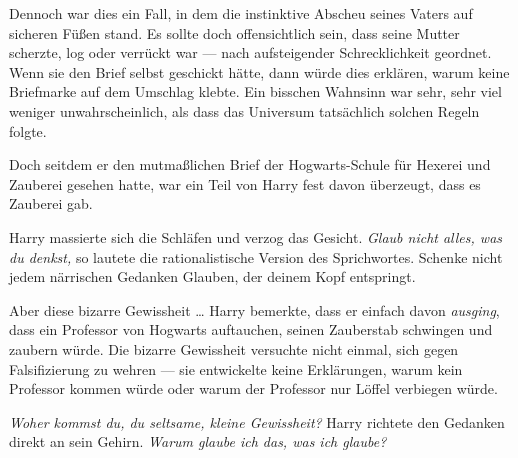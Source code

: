 Dennoch war dies ein Fall, in dem die instinktive Abscheu seines Vaters auf sicheren Füßen stand. Es sollte doch offensichtlich sein, dass seine Mutter scherzte, log oder verrückt war — nach aufsteigender Schrecklichkeit geordnet. Wenn sie den Brief selbst geschickt hätte, dann würde dies erklären, warum keine Briefmarke auf dem Umschlag klebte. Ein bisschen Wahnsinn war sehr, sehr viel weniger unwahrscheinlich, als dass das Universum tatsächlich solchen Regeln folgte.

Doch seitdem er den mutmaßlichen Brief der Hogwarts-Schule für Hexerei und Zauberei gesehen hatte, war ein Teil von Harry fest davon überzeugt, dass es Zauberei gab.

Harry massierte sich die Schläfen und verzog das Gesicht. \emph{Glaub nicht alles, was du denkst,} so lautete die rationalistische Version des Sprichwortes. Schenke nicht jedem närrischen Gedanken Glauben, der deinem Kopf entspringt.

Aber diese bizarre Gewissheit … Harry bemerkte, dass er einfach davon \emph{ausging}, dass ein Professor von Hogwarts auftauchen, seinen Zauberstab schwingen und zaubern würde. Die bizarre Gewissheit versuchte nicht einmal, sich gegen Falsifizierung zu wehren — sie entwickelte keine Erklärungen, warum kein Professor kommen würde oder warum der Professor nur Löffel verbiegen würde.

\emph{Woher kommst du, du seltsame, kleine Gewissheit?} Harry richtete den Gedanken direkt an sein Gehirn. \emph{Warum glaube ich das, was ich glaube?}

